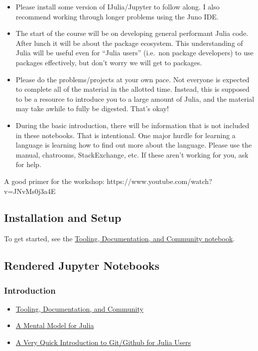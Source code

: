 \documentclass[11pt]{article}
\begin{document}
\begin{itemize}
\itemsep1pt\parskip0pt
\item
  Please install some version of IJulia/Jupyter to follow along. I also
  recommend working through longer problems using the Juno IDE.
\item
  The start of the course will be on developing general performant Julia
  code. After lunch it will be about the package ecosystem. This
  understanding of Julia will be useful even for ``Julia users''
  (i.e.~non package developers) to use packages effectively, but don't
  worry we will get to packages.
\item
  Please do the problems/projects at your own pace. Not everyone is
  expected to complete all of the material in the allotted time.
  Instead, this is supposed to be a resource to introduce you to a large
  amount of Julia, and the material may take awhile to fully be
  digested. That's okay!
\item
  During the basic introduction, there will be information that is not
  included in these notebooks. That is intentional. One major hurdle for
  learning a language is learning how to find out more about the
  language. Please use the manual, chatrooms, StackExchange, etc. If
  these aren't working for you, ask for help.
\end{itemize}

A good primer for the workshop:
https://www.youtube.com/watch?v=JNvMs0j3a4E

    \subsection{Installation and Setup}\label{installation-and-setup}

To get started, see the
\href{http://ucidatascienceinitiative.github.io/IntroToJulia/Html/ToolingDocumentationCommunity}{Tooling,
Documentation, and Community notebook}.

    \subsection{Rendered Jupyter
Notebooks}\label{rendered-jupyter-notebooks}

\subsubsection{Introduction}\label{introduction}

\begin{itemize}
\itemsep1pt\parskip0pt
\item
  \href{http://ucidatascienceinitiative.github.io/IntroToJulia/Html/ToolingDocumentationCommunity}{Tooling,
  Documentation, and Community}
\item
  \href{http://ucidatascienceinitiative.github.io/IntroToJulia/Html/JuliaMentalModel}{A
  Mental Model for Julia}
\item
  \href{http://ucidatascienceinitiative.github.io/IntroToJulia/Html/GithubIntroduction}{A
  Very Quick Introduction to Git/Github for Julia Users}
\end{itemize}
\end{document}
